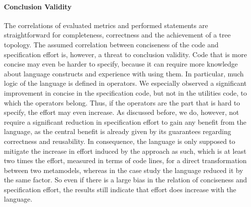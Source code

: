 
\paragraph{Conclusion Validity}
The correlations of evaluated metrics and performed statements are straightforward for completeness, correctness and the achievement of a tree topology.
The assumed correlation between conciseness of the code and specification effort is, however, a threat to conclusion validity.
Code that is more concise may even be harder to specify, because it can require more knowledge about language constructs and experience with using them.
In particular, much logic of the \commonalities language is defined in operators.
We especially observed a significant improvement in concise in the specification code, but not in the utilities code, to which the operators belong.
Thus, if the operators are the part that is hard to specify, the effort may even increase.
As discussed before, we do, however, not require a significant reduction in specification effort to gain any benefit from the \commonalities language, as the central benefit is already given by its guarantees regarding correctness and reusability.
In consequence, the language is only supposed to mitigate the increase in effort induced by the \commonalities approach as such, which is at least two times the effort, measured in terms of code lines, for a direct transformation between two metamodels, whereas in the case study the language reduced it by the same factor.
So even if there is a large bias in the relation of conciseness and specification effort, the results still indicate that effort does increase with the \commonalities language.

